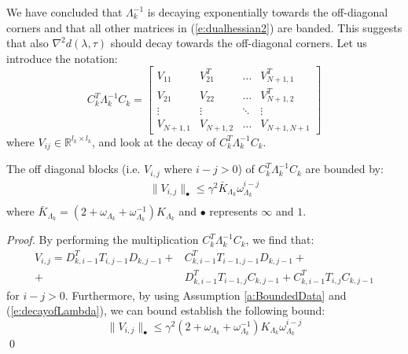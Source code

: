 We have concluded that $\Lambda_k^{-1}$ is decaying exponentially towards the off-diagonal corners and that all other matrices in (\ref{e:dualhessian2}) are banded. This suggests that also $\nabla^2 d(\lambda, \tau)$ should decay towards the off-diagonal corners. Let us introduce the notation:
\begin{equation}
C_k^T \Lambda_k^{-1} C_k = \left[ \begin{array}{cccc}
V_{11} & V_{21}^T & \hdots & V_{N+1,1}^T \\
V_{21} & V_{22} & \hdots & V_{N+1,2}^T \\
\vdots & \vdots  & \ddots & \vdots \\
V_{N+1,1} & V_{N+1,2} & \hdots & V_{N+1,N+1}
\end{array} \right]
\end{equation}
where $V_{ij} \in \mathbb{R}^{l_{k} \times l_{k}}$, and look at the decay of $C_k^T \Lambda_k^{-1} C_k$.

\begin{proposition} \label{p:intermediateDecay}
The off diagonal blocks (i.e. $V_{i,j}$ where $i - j > 0$) of $C_k^T \Lambda_k^{-1} C_k$ are bounded by:
\begin{subequations}
\begin{align}
\| V_{i,j} \|_\bullet \leq \gamma^2 \bar{K}_{\Lambda_k} \omega_{\Lambda_k}^{i-j} \\
\end{align}
\end{subequations}
where $\bar{K}_{\Lambda_k} = (2 + \omega_{\Lambda_k} + \omega_{\Lambda_k}^{-1}) K_{\Lambda_k}$ and $\bullet$ represents $\infty$ and $1$.
\end{proposition}
\begin{proof}
By performing the multiplication $C_k^T \Lambda_k^{-1} C_k$, we find that:
\begin{equation}
\begin{aligned}
V_{i,j} = D_{k,i-1}^T T_{i,j-1} D_{k,j-1} + & C_{k,i-1}^T T_{i-1,j-1} D_{k,j-1} + \\ + & D_{k,i-1}^T T_{i-1,j} C_{k,j-1} + C_{k,i-1}^T T_{i,j} C_{k,j-1}
\end{aligned}
\end{equation}
for $i - j > 0$. Furthermore, by using Assumption \ref{a:BoundedData} and (\ref{e:decayofLambda}), we can bound establish the following bound:
\begin{equation}
\| V_{i,j} \|_{\bullet} \leq \gamma^2 (2 + \omega_{\Lambda_k} + \omega_{\Lambda_k}^{-1}) K_{\Lambda_k} \omega_{\Lambda_k}^{i-j}
\end{equation}
\qed
\end{proof}


